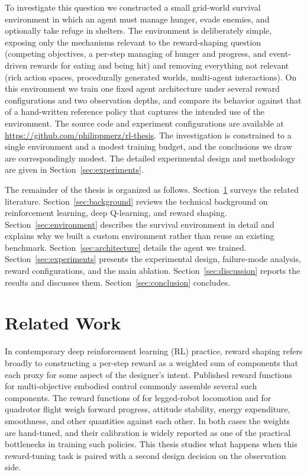 \documentclass[12pt,a4paper,titlepage]{article}
\begin{document}
To investigate this question we constructed a small grid-world survival environment in which an agent must manage hunger, evade enemies, and optionally take refuge in shelters. The environment is deliberately simple, exposing only the mechanisms relevant to the reward-shaping question (competing objectives, a per-step managing of hunger and progress, and event-driven rewards for eating and being hit) and removing everything not relevant (rich action spaces, procedurally generated worlds, multi-agent interactions). On this environment we train one fixed agent architecture under several reward configurations and two observation depths, and compare its behavior against that of a hand-written reference policy that captures the intended use of the environment. The source code and experiment configurations are available at \url{https://github.com/philippmerz/rl-thesis}. The investigation is constrained to a single environment and a modest training budget, and the conclusions we draw are correspondingly modest. The detailed experimental design and methodology are given in Section~\ref{sec:experiments}.

The remainder of the thesis is organized as follows. Section~\ref{sec:related_work} surveys the related literature. Section~\ref{sec:background} reviews the technical background on reinforcement learning, deep Q-learning, and reward shaping. Section~\ref{sec:environment} describes the survival environment in detail and explains why we built a custom environment rather than reuse an existing benchmark. Section~\ref{sec:architecture} details the agent we trained. Section~\ref{sec:experiments} presents the experimental design, failure-mode analysis, reward configurations, and the main ablation. Section~\ref{sec:discussion} reports the results and discusses them. Section~\ref{sec:conclusion} concludes.

\section{Related Work}
\label{sec:related_work}

In contemporary deep reinforcement learning (RL) practice, reward shaping refers broadly to constructing a per-step reward as a weighted sum of components that each proxy for some aspect of the designer's intent. Published reward functions for multi-objective embodied control commonly assemble several such components. The reward functions of \citet{Hwangbo2019} for legged-robot locomotion and \citet{Hwangbo2017} for quadrotor flight weigh forward progress, attitude stability, energy expenditure, smoothness, and other quantities against each other. In both cases the weights are hand-tuned, and their calibration is widely reported as one of the practical bottlenecks in training such policies. This thesis studies what happens when this reward-tuning task is paired with a second design decision on the observation side.
\end{document}

